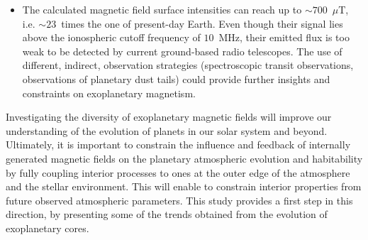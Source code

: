 \documentclass[draft]{agujournal2019} %
\begin{document}
\begin{itemize}
    \item {The calculated magnetic field surface intensities can reach up to $\sim 700$~$\mu$T, i.e. $\sim23$~times the one of present-day Earth. Even though their signal lies above the ionospheric cutoff frequency of $10$~MHz, their emitted flux is too weak to be detected by current ground-based radio telescopes. The use of different, indirect, observation strategies (spectroscopic transit observations, observations of planetary dust tails) could provide further insights and constraints on exoplanetary magnetism.}
\end{itemize}

Investigating the diversity of exoplanetary magnetic fields will improve our understanding of the evolution of planets in our solar system and beyond. Ultimately, it is important to constrain the influence and feedback of internally generated magnetic fields on the planetary atmospheric evolution and habitability by fully coupling interior processes to ones at the outer edge of the atmosphere and the stellar environment. This will enable to constrain interior properties from future observed atmospheric parameters. This study provides a first step in this direction, by presenting some of the trends obtained from the evolution of exoplanetary cores.


%
%
%
%
%
%
\end{document}
